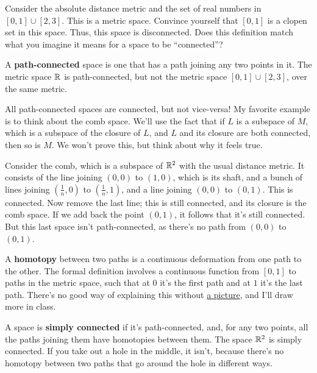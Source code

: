 \documentclass[11pt,paper=letter]{scrartcl}
\renewcommand{\bluebf}[1]{{\bfseries \color{Blue} #1}}
\begin{document}
\begin{exrboxed}
  Consider the absolute distance metric and the set of real numbers in $[0, 1] \cup [2, 3]$. This is a metric space. Convince yourself that $[0, 1]$ is a clopen set in this space. Thus, this space is disconnected. Does this definition match what you imagine it means for a space to be ``connected''?
\end{exrboxed}

A \textbf{ path-connected } space is one that has a path joining any two points in it. The metric space $\mathbb R$ is path-connected, but not the metric space $[ 0, 1 ] \cup [ 2, 3 ]$, over the same metric.

\begin{remboxed}
  All path-connected spaces are connected, but not vice-versa! My favorite example is to think about the comb space. We'll use the fact that if $L$ is a subspace of $M$, which is a subspace of the closure of $L$, and $L$ and its closure are both connected, then so is $M$. We won't prove this, but think about why it feels true.

  Consider the comb, which is a subspace of $\mathbb R^2$ with the usual distance metric. It consists of the line joining $(0, 0)$ to $(1, 0)$, which is its shaft, and a bunch of lines joining $ \left( \frac{1}{n} , 0 \right) $ to $ \left( \frac{1}{n} , 1 \right) $, and a line joining $ \left( 0, 0 \right) $ to $ \left( 0, 1 \right) $. This is connected. Now remove the last line; this is still connected, and its closure is the comb space. If we add back the point $(0, 1)$, it follows that it's still connected. But this last space isn't path-connected, as there's no path from $(0, 0)$ to $(0, 1)$.
\end{remboxed}

A \textbf{homotopy} between two paths is a continuous deformation from one path to the other. The formal definition involves a continuous function from $[0, 1]$ to paths in the metric space, such that at $0$ it's the first path and at $1$ it's the last path. There's no good way of explaining this without \href{https://commons.wikimedia.org/wiki/File:HomotopySmall.gif}{a picture}, and I'll draw more in class.

A space is \bluebf{simply connected} if it's path-connected, and, for any two points, all the paths joining them have homotopies between them. The space $\mathbb R^2$ is simply connected. If you take out a hole in the middle, it isn't, because there's no homotopy between two paths that go around the hole in different ways.
\end{document}
